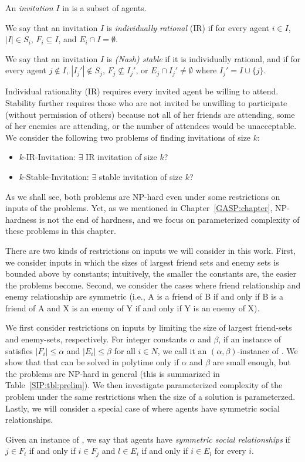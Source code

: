 \begin{definition} 
An {\em invitation} $I$ in \SIPs is a subset of agents.

	We say that an invitation $I$ is {\em individually rational} (IR) if for every agent $i\in I$, $|I| \in S_i$, $F_i \subseteq I$, and $E_i \cap I = \emptyset$.
	
	We say that an invitation $I$ is {\em (Nash) stable} if it is individually rational, and if for every agent $j \not\in I$, $|I_j'| \not\in S_j$, $F_j \not\subseteq I_j'$, or $E_j \cap I_j' \neq \emptyset$ where $I_j' = I \cup \{j\}$.
\end{definition}

Individual rationality (IR) requires every invited agent be willing to attend.
Stability further requires those who are not invited be unwilling to participate (without permission of others)
because not all of her friends are attending, some of her enemies are attending, or the number of attendees would be unacceptable. 
We consider the following two problems of finding invitations of size $k$:
\begin{itemize}
	\item $k$-IR-Invitation: $\exists$ IR invitation of size $k$?
	\item $k$-Stable-Invitation: $\exists$ stable invitation of size $k$?
\end{itemize}

As we shall see, both problems are NP-hard even under some restrictions on inputs of the problems. Yet, as we mentioned in Chapter~\ref{GASP:chapter}, NP-hardness is not the end of hardness, and we focus on parameterized complexity of these problems in this chapter. 

There are two kinds of restrictions on inputs we will consider in this work.
First, we consider inputs in which the sizes of largest friend sets and enemy sets is bounded above by constants; intuitively, the smaller the constants are, the easier the problems become. Second, we consider the cases where friend relationship and enemy relationship are symmetric (i.e., A is a friend of B if and only if B is a friend of A and X is an enemy of Y if and only if Y is an enemy of X). 

We first consider restrictions on inputs by limiting the size of largest friend-sets and enemy-sets, respectively. 
For integer constants $\alpha$ and $\beta$, if an instance of \SIPs satisfies $|F_i| \leq \alpha$ and $|E_i| \leq \beta$ for all $i\in N$, we call it an $(\alpha,\beta)$-instance of \SIP.
We show that that \SIPs can be solved in polytime only if $\alpha$ and $\beta$ are small enough, but the problems are NP-hard in general (this is summarized in Table~\ref{SIP:tbl:prelim}).
We then investigate parameterized complexity of the problem under the same restrictions when the size of a solution is parameterzed. 
Lastly, we will consider a special case of \SIPs where agents have symmetric social relationships.
\begin{definition} \label{SIP:def:symmetric_social}
	Given an instance of \SIP, we say that agents have {\em symmetric social relationships} if $j\in F_i$ if and only if $i\in F_j$ and $l \in E_i$ if and only if $i \in E_l$ for every $i$. 
\end{definition}

